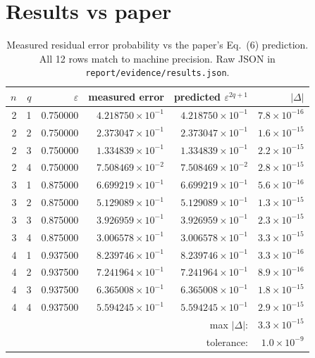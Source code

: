 \documentclass[11pt]{article}
\begin{document}
\section{Results vs paper}

\begin{table}[h]
\centering
\small
\begin{tabular}{rrrrrr}
\toprule
$n$ & $q$ & $\varepsilon$ & measured error & predicted $\varepsilon^{2q+1}$ & $|\Delta|$ \\
\midrule
2 & 1 & 0.750000 & $4.218750\!\times\!10^{-1}$ & $4.218750\!\times\!10^{-1}$ & $7.8\!\times\!10^{-16}$ \\
2 & 2 & 0.750000 & $2.373047\!\times\!10^{-1}$ & $2.373047\!\times\!10^{-1}$ & $1.6\!\times\!10^{-15}$ \\
2 & 3 & 0.750000 & $1.334839\!\times\!10^{-1}$ & $1.334839\!\times\!10^{-1}$ & $2.2\!\times\!10^{-15}$ \\
2 & 4 & 0.750000 & $7.508469\!\times\!10^{-2}$ & $7.508469\!\times\!10^{-2}$ & $2.8\!\times\!10^{-15}$ \\
3 & 1 & 0.875000 & $6.699219\!\times\!10^{-1}$ & $6.699219\!\times\!10^{-1}$ & $5.6\!\times\!10^{-16}$ \\
3 & 2 & 0.875000 & $5.129089\!\times\!10^{-1}$ & $5.129089\!\times\!10^{-1}$ & $1.3\!\times\!10^{-15}$ \\
3 & 3 & 0.875000 & $3.926959\!\times\!10^{-1}$ & $3.926959\!\times\!10^{-1}$ & $2.3\!\times\!10^{-15}$ \\
3 & 4 & 0.875000 & $3.006578\!\times\!10^{-1}$ & $3.006578\!\times\!10^{-1}$ & $3.3\!\times\!10^{-15}$ \\
4 & 1 & 0.937500 & $8.239746\!\times\!10^{-1}$ & $8.239746\!\times\!10^{-1}$ & $3.3\!\times\!10^{-16}$ \\
4 & 2 & 0.937500 & $7.241964\!\times\!10^{-1}$ & $7.241964\!\times\!10^{-1}$ & $8.9\!\times\!10^{-16}$ \\
4 & 3 & 0.937500 & $6.365008\!\times\!10^{-1}$ & $6.365008\!\times\!10^{-1}$ & $1.8\!\times\!10^{-15}$ \\
4 & 4 & 0.937500 & $5.594245\!\times\!10^{-1}$ & $5.594245\!\times\!10^{-1}$ & $2.9\!\times\!10^{-15}$ \\
\midrule
\multicolumn{5}{r}{max $|\Delta|$:} & $3.3\!\times\!10^{-15}$ \\
\multicolumn{5}{r}{tolerance:} & $1.0\!\times\!10^{-9}$ \\
\bottomrule
\end{tabular}
\caption{Measured residual error probability vs the paper's Eq.~(6) prediction.
All 12 rows match to machine precision. Raw JSON in
\texttt{report/evidence/results.json}.}
\end{table}
\end{document}
